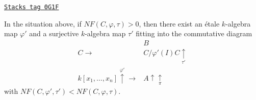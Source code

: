 \begin{lemma}
\label{pione-lemma-lower-invariant}
\href{https://stacks.math.columbia.edu/tag/0G1F}{\texttt{Stacks tag 0G1F}}

In the situation above, if $NF(C, \varphi, \tau) > 0$, then there exist
an \'etale $k$-algebra map $\varphi'$ and a surjective $k$-algebra map
$\tau'$ fitting into the commutative diagram
$$
\begin{array}{cc} & B \\ C \longrightarrow & C/\varphi'(I)C \underset{\tau'}{\uparrow} \\ k[x_1, \ldots, x_n] \overset{\varphi'}{\uparrow}\longrightarrow & A \uparrow\underset{\pi}{\uparrow}\end{array}
$$
with $NF(C, \varphi', \tau') < NF(C, \varphi, \tau)$.
\end{lemma}

